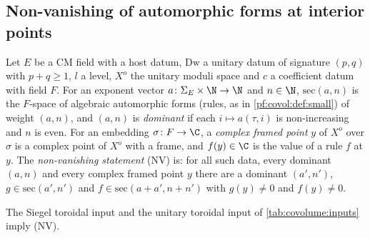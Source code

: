 \subsection{Non-vanishing of automorphic forms at interior points}\label{sec:pf:covol:nv}

\begin{definition}\label{pf:covol:def:sec}
Let $E$ be a CM field with a host datum, $\mathrm{Dw}$ a unitary datum of signature $(p,q)$ with
$p+q\ge1$, $l$ a level, $X^o$ the unitary moduli space and $c$ a coefficient datum with field $F$. For an
exponent vector $a\colon\Sigma_E\times\N\to\N$ and $n\in\N$, $\mathrm{sec}(a,n)$ is the $F$-space of
algebraic automorphic forms (rules, as in \cref{pf:covol:def:small}) of weight $(a,n)$, and $(a,n)$ is
\emph{dominant} if each $i\mapsto a(\tau,i)$ is non-increasing and $n$ is even. For an embedding
$\sigma\colon F\to\C$, a \emph{complex framed point} $y$ of $X^o$ over $\sigma$ is a complex point of $X^o$
with a frame, and $f(y)\in\C$ is the value of a rule $f$ at $y$. The \emph{non-vanishing statement} (NV)
is: for all such data, every dominant $(a,n)$ and every complex framed point $y$ there are a dominant
$(a',n')$, $g\in\mathrm{sec}(a',n')$ and $f\in\mathrm{sec}(a+a',n+n')$ with $g(y)\ne0$ and $f(y)\ne0$.
%
\end{definition}

\begin{theorem}\label{pf:covol:thm:nv}
The Siegel toroidal input and the unitary toroidal input of \cref{tab:covolume:inputs} imply (NV).
\end{theorem}

